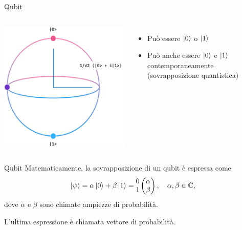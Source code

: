 \documentclass{beamer}
\begin{document}
    \begin{frame}{Qubit}
        \begin{columns}
            \includegraphics[width=\textwidth]{gfx/qubit_ibm.png}
            \begin{itemize}
                \item Può essere $\ket{0}$ o $\ket{1}$
                \item Può anche essere $\ket{0}$ e $\ket{1}$ contemporaneamente (sovrapposizione quantistica)
            \end{itemize}
        \end{columns}
    \end{frame}

    \begin{frame}{Qubit}
        Matematicamente, la sovrapposizione di un qubit è espressa come
        \begin{equation*}
            \ket{\psi} = \alpha \ket{0} + \beta \ket{1} = \begin{matrix}
                0 \\ 1
            \end{matrix}\begin{pmatrix}
                \alpha \\ \beta
            \end{pmatrix}
            , \quad \alpha, \beta \in \mathbb{C}, 
        \end{equation*}
        dove $\alpha$ e $\beta$ sono chimate ampiezze di probabilità. 
        
        L'ultima espressione è chiamata vettore di probabilità. 
    \end{frame}
\end{document}
